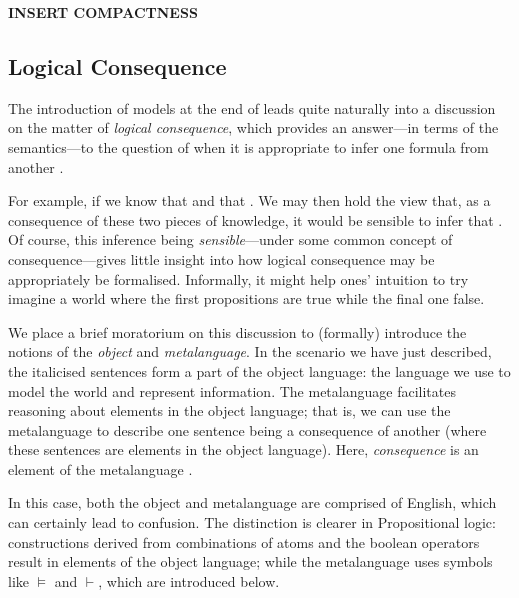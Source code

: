 \begin{definition}
\label{definition:compactness}
\textbf{INSERT COMPACTNESS}
\end{definition}

\subsection{Logical Consequence}
\label{subsection:logical-consequence}

The introduction of models at the end of  leads quite naturally into a discussion on the matter of \textit{logical consequence}, which provides an answer---in terms of the semantics---to the question of when it is appropriate to infer one formula from another  \cite[p. 408]{tarski1936consequence}.

For example, if we know that  and that . We may then hold the view that, as a consequence of these two pieces of knowledge, it would be sensible to infer that . Of course, this inference being \textit{sensible}---under some common concept of consequence---gives little insight into how logical consequence may be appropriately be formalised. Informally, it might help ones' intuition to try imagine a world where the first propositions are true while the final one false.

 
We place a brief moratorium on this discussion to (formally) introduce the notions of the \textit{object} and \textit{metalanguage}. In the scenario we have just described, the italicised sentences form a part of the object language: the language we use to model the world and represent information. The metalanguage facilitates reasoning about elements in the object language; that is, we can use the metalanguage to describe one sentence being a consequence of another (where these sentences are elements in the object language). Here, \textit{consequence} is an element of the metalanguage \cite[p 22]{Ben1993Mathematical}.

In this case, both the object and metalanguage are comprised of English, which can certainly lead to confusion. The distinction is clearer in Propositional logic: constructions derived from combinations of atoms and the boolean operators result in elements of the object language; while the metalanguage uses symbols like $\vDash$ and $\vdash$, which are introduced below.

